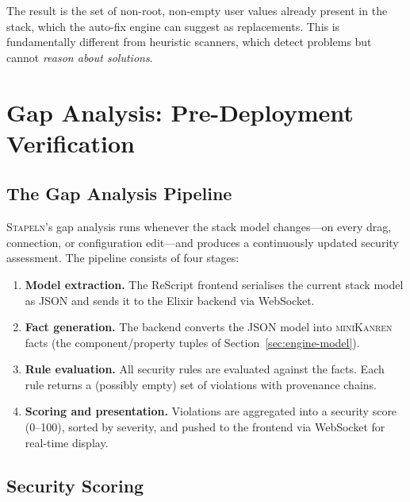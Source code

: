 \documentclass[11pt,twocolumn]{article}
\newcommand{\stapeln}{\textsc{Stapeln}\xspace}
\newcommand{\minikanren}{\textsc{miniKanren}\xspace}
\begin{document}
The result is the set of non-root, non-empty user values already
present in the stack, which the auto-fix engine can suggest as
replacements. This is fundamentally different from heuristic scanners,
which detect problems but cannot \emph{reason about solutions}.


\section{Gap Analysis: Pre-Deployment Verification}
\label{sec:gap}

\subsection{The Gap Analysis Pipeline}
\label{sec:gap-pipeline}

\stapeln's gap analysis runs whenever the stack model changes---on
every drag, connection, or configuration edit---and produces a
continuously updated security assessment. The pipeline consists of
four stages:

\begin{enumerate}[leftmargin=*]
\item \textbf{Model extraction.} The ReScript frontend serialises the
      current stack model as JSON and sends it to the Elixir backend
      via WebSocket.

\item \textbf{Fact generation.} The backend converts the JSON model
      into \minikanren facts (the component/property tuples of
      Section~\ref{sec:engine-model}).

\item \textbf{Rule evaluation.} All security rules are evaluated
      against the facts. Each rule returns a (possibly empty) set of
      violations with provenance chains.

\item \textbf{Scoring and presentation.} Violations are aggregated
      into a security score (0--100), sorted by severity, and pushed
      to the frontend via WebSocket for real-time display.
\end{enumerate}

\subsection{Security Scoring}
\label{sec:gap-scoring}
\end{document}
